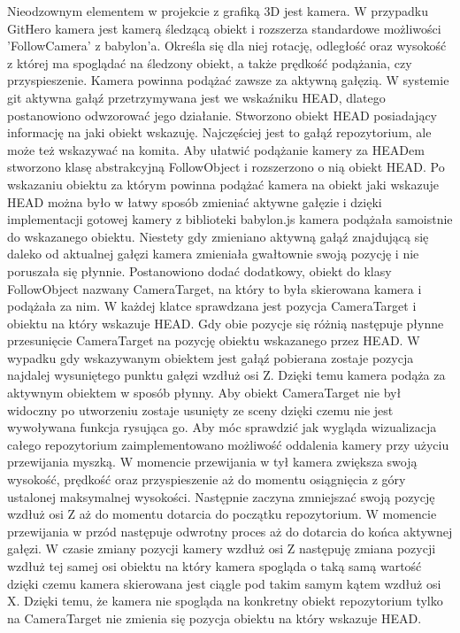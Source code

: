 \documentclass[11pt,a4paper,polish,thesis]{dcsbook}
\begin{document}
	Nieodzownym elementem w projekcie z grafiką 3D jest kamera. W przypadku GitHero kamera jest kamerą śledzącą obiekt i rozszerza standardowe możliwości 'FollowCamera' z babylon'a. Określa się dla niej rotację, odległość oraz wysokość z której ma spoglądać na śledzony obiekt, a także prędkość podążania, czy przyspieszenie. Kamera powinna podążać zawsze za aktywną gałęzią. W systemie git aktywna gałąź przetrzymywana jest we wskaźniku HEAD, dlatego postanowiono odwzorować jego działanie. Stworzono obiekt HEAD posiadający informację na jaki obiekt wskazuję. Najczęściej jest to gałąź repozytorium, ale może też wskazywać na komita. Aby ułatwić podążanie kamery za HEADem stworzono klasę abstrakcyjną FollowObject i rozszerzono o nią obiekt HEAD. Po wskazaniu obiektu za którym powinna podążać kamera na obiekt jaki wskazuje HEAD można było w łatwy sposób zmieniać aktywne gałęzie i dzięki implementacji gotowej kamery z biblioteki babylon.js kamera podążała samoistnie do wskazanego obiektu. Niestety gdy zmieniano aktywną gałąź znajdującą się daleko od aktualnej gałęzi kamera zmieniała gwałtownie swoją pozycję i nie poruszała się płynnie. Postanowiono dodać dodatkowy, obiekt do klasy FollowObject nazwany CameraTarget, na który to była skierowana kamera i podążała za nim. W każdej klatce sprawdzana jest pozycja CameraTarget i obiektu na który wskazuje HEAD. Gdy obie pozycje się różnią następuje płynne przesunięcie CameraTarget na pozycję obiektu wskazanego przez HEAD. W wypadku gdy wskazywanym obiektem jest gałąź pobierana zostaje pozycja najdalej wysuniętego punktu gałęzi wzdłuż osi Z. Dzięki temu kamera podąża za aktywnym obiektem w sposób płynny. Aby obiekt CameraTarget nie był widoczny po utworzeniu zostaje usunięty ze sceny dzięki czemu nie jest wywoływana funkcja rysująca go. Aby móc sprawdzić jak wygląda wizualizacja całego repozytorium zaimplementowano możliwość oddalenia kamery przy użyciu przewijania myszką. W momencie przewijania w tył kamera zwiększa swoją wysokość, prędkość oraz przyspieszenie aż do momentu osiągnięcia z góry ustalonej maksymalnej wysokości. Następnie zaczyna zmniejszać swoją pozycję wzdłuż osi Z aż do momentu dotarcia do początku repozytorium. W momencie przewijania w przód następuje odwrotny proces aż do dotarcia do końca aktywnej gałęzi. W czasie zmiany pozycji kamery wzdłuż osi Z następuję zmiana pozycji wzdłuż tej samej osi obiektu na który kamera spogląda o taką samą wartość dzięki czemu kamera skierowana jest ciągle pod takim samym kątem wzdłuż osi X. Dzięki temu, że kamera nie spogląda na konkretny obiekt repozytorium tylko na CameraTarget nie zmienia się pozycja obiektu na który wskazuje HEAD.
	
\end{document}
